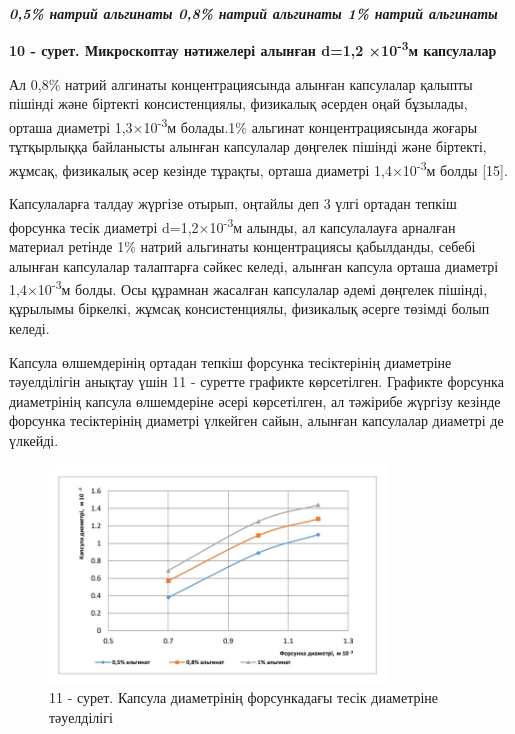 \emph{{\bfseries 0,5\% натрий альгинаты 0,8\% натрий альгинаты 1\% натрий альгинаты}}

{\bfseries 10 - сурет. Микроскоптау нәтижелері алынған d=1,2 ×10\textsuperscript{-3}м капсулалар}

\begin{multicols}{2}
Ал 0,8\% натрий алгинаты концентрациясында алынған капсулалар қалыпты
пішінді және біртекті консистенциялы, физикалық әсерден оңай бұзылады,
орташа диаметрі 1,3×10\textsuperscript{-3}м болады.1\% альгинат
концентрациясында жоғары тұтқырлыққа байланысты алынған капсулалар
дөңгелек пішінді және біртекті, жұмсақ, физикалық әсер кезінде тұрақты,
орташа диаметрі 1,4×10\textsuperscript{-3}м болды {[}15{]}.

Капсулаларға талдау жүргізе отырып, оңтайлы деп 3 үлгі ортадан тепкіш
форсунка тесік диаметрі d=1,2×10\textsuperscript{-3}м алынды, ал
капсулалауға арналған материал ретінде 1\% натрий альгинаты
концентрациясы қабылданды, себебі алынған капсулалар талаптарға сәйкес
келеді, алынған капсула орташа диаметрі 1,4×10\textsuperscript{-3}м
болды. Осы құрамнан жасалған капсулалар әдемі дөңгелек пішінді, құрылымы
біркелкі, жұмсақ консистенциялы, физикалық әсерге төзімді болып келеді.

Капсула өлшемдерінің ортадан тепкіш форсунка тесіктерінің диаметріне
тәуелділігін анықтау үшін 11 - суретте графикте көрсетілген. Графикте
форсунка диаметрінің капсула өлшемдеріне әсері көрсетілген, ал тәжірибе
жүргізу кезінде форсунка тесіктерінің диаметрі үлкейген сайын, алынған
капсулалар диаметрі де үлкейді.
\end{multicols}


\begin{figure}[H]
	\centering
	\includegraphics[width=0.8\textwidth]{media/pish/image44}
	\caption*{11 - сурет. Капсула диаметрінің форсункадағы тесік диаметріне тәуелділігі}
\end{figure}

